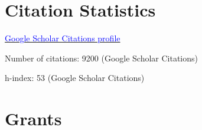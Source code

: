 \documentclass[11pt,letter]{article}
\renewenvironment{itemize}{
  \begin{list}{}{
    \setlength{\leftmargin}{1.5em}
    \setlength{\itemsep}{0.25em}
    \setlength{\parskip}{0pt}
    \setlength{\parsep}{0.25em}
  }
}{
  \end{list}
}
\begin{document}
\section*{\bf \normalsize Citation Statistics}

\begin{itemize}
\item \href{https://scholar.google.com/citations?user=fZDoOnMAAAAJ}{\textcolor{blue}{Google Scholar Citations profile}}
\item Number of citations: 9200 (Google Scholar Citations)
\item h-index: 53 (Google Scholar Citations)
\end{itemize}

\section*{\bf \normalsize Grants}
\end{document}
